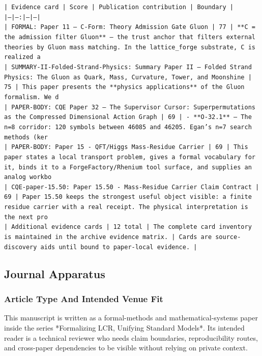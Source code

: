 \documentclass[11pt]{article}
\begin{document}
\noindent\texttt{| Evidence card | Score | Publication contribution | Boundary |}\\
\noindent\texttt{|---|---:|---|---|}\\
\noindent\texttt{| FORMAL: Paper 11 — C-Form: Theory Admission Gate Gluon | 77 | **C = the admission filter Gluon** — the trust anchor that filters external theories by Gluon mass matching. In the lattice\_forge substrate, C is realized a}\\
\noindent\texttt{| SUMMARY-II-Folded-Strand-Physics: Summary Paper II — Folded Strand Physics: The Gluon as Quark, Mass, Curvature, Tower, and Moonshine | 75 | This paper presents the **physics applications** of the Gluon formalism. We d}\\
\noindent\texttt{| PAPER-BODY: CQE Paper 32 — The Supervisor Cursor: Superpermutations as the Compressed Dimensional Action Graph | 69 | - **O-32.1** — The n=8 corridor: 120 symbols between 46085 and 46205. Egan's n=7 search methods (ker}\\
\noindent\texttt{| PAPER-BODY: Paper 15 - QFT/Higgs Mass-Residue Carrier | 69 | This paper states a local transport problem, gives a formal vocabulary for it, binds it to a ForgeFactory/Rhenium tool surface, and supplies an analog workbo}\\
\noindent\texttt{| CQE-paper-15.50: Paper 15.50 - Mass-Residue Carrier Claim Contract | 69 | Paper 15.50 keeps the strongest useful object visible: a finite residue carrier with a real receipt. The physical interpretation is the next pro}\\
\noindent\texttt{| Additional evidence cards | 12 total | The complete card inventory is maintained in the archive evidence matrix. | Cards are source-discovery aids until bound to paper-local evidence. |}\\

\subsection*{Journal Apparatus}

\subsubsection*{Article Type And Intended Venue Fit}

This manuscript is written as a formal-methods and mathematical-systems paper
inside the series *Formalizing LCR, Unifying Standard Models*. Its intended
reader is a technical reviewer who needs claim boundaries, reproducibility
routes, and cross-paper dependencies to be visible without relying on private
context.
\end{document}
